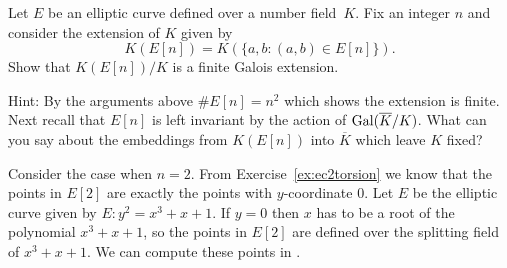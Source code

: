 \begin{exercise}\label{QE[p]finitegaloisext}
	Let $E$ be an elliptic curve defined over a number
	field~$K$. Fix an integer $n$ and consider the
	extension of $K$ given by
	$$
	K(E[n]) = K(\{a,b : (a,b) \in E[n]\}).
	$$
	Show that $K(E[n])/K$ is a finite Galois extension.
	
	Hint: By the arguments above $\#E[n] = n^2$ which shows
	the extension is finite. Next recall that $E[n]$ is left
	invariant by the action of $\operatorname{Gal}(\overline{K}/K)$. What
	can you say about the embeddings from $K(E[n])$ into
	$\overline{K}$ which leave $K$ fixed?
\end{exercise}

\begin{example}
Consider the case when $n=2$. From Exercise~\ref{ex:ec2torsion}
we know that the points in $E[2]$ are exactly the points with
$y$-coordinate $0$. Let $E$ be the elliptic curve given by
$E: y^2 = x^3 + x + 1$. If $y=0$ then $x$ has to be a root
of the polynomial $x^3 + x + 1$, so the points in $E[2]$
are defined over the splitting field of $x^3 + x + 1$.
We can compute these points in \sage.


\end{example}
